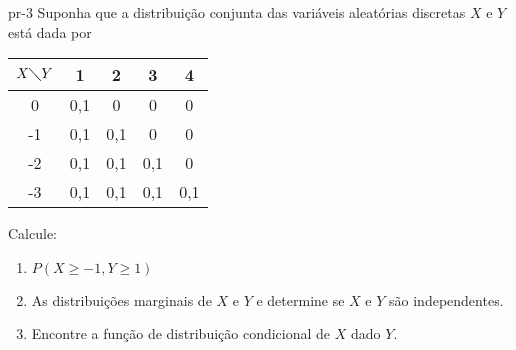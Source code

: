 \begin{problema}{}{pr-3}
Suponha que a distribuição conjunta das variáveis aleatórias discretas $X$ e $Y$ está dada por
\begin{center}
	\begin{tabular}{|c|c|c|c|c|} \hline
		$X \diagdown Y$ & 1 & 2 & 3 & 4 \\ \hline
		0 & 0,1 & 0 & 0 & 0 \\ \hline
		-1 & 0,1 & 0,1 & 0 & 0 \\ \hline
		-2 & 0,1 & 0,1 & 0,1 & 0 \\ \hline
		-3 & 0,1 & 0,1 & 0,1 & 0,1 \\ \hline
	\end{tabular}
\end{center}
Calcule:
\begin{enumerate}
	\item $ P(X \geq -1, Y \geq 1) $
	\item As distribuições marginais de $X$ e $Y$ e determine se $X$ e $Y$ são independentes.
	\item Encontre a função de distribuição condicional de $X$ dado $Y.$
\end{enumerate}
%
\end{problema}


